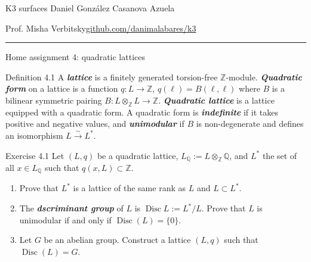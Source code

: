 

\usepackage[style=authortitle-terse,backend=bibtex]{biblatex}


\setcounter{secnumdepth}{0}



\begin{minipage}{\textwidth}
	\begin{minipage}{1\textwidth}
		K3 surfaces \hfill Daniel González Casanova Azuela
		
		{\small Prof. Misha Verbitsky\hfill\href{https://github.com/danimalabares/k3}{github.com/danimalabares/k3}}
	\end{minipage}
\end{minipage}\vspace{.2cm}\hrule

\vspace{10pt}
{\huge Home assignment 4: quadratic lattices}

\begin{idea5}{Definition 4.1}\leavevmode
	A \textit{\textbf{lattice}} is a finitely generated torsion-free $\mathbb{Z}$-module. \textit{\textbf{Quadratic form}} on a lattice is a function $q:L\to \mathbb{Z}$, $q(\ell)=B(\ell,\ell)$ where $B$ is a bilinear symmetric pairing $B:L\otimes_\mathbb{Z}L\longrightarrow \mathbb{Z}$. \textit{\textbf{Quadratic lattice}} is a lattice equipped with a quadratic form. A quadratic form is \textit{\textbf{indefinite}} if it takes positive and negative values, and \textit{\textbf{unimodular}} if $B$ is non-degenerate and defines an isomorphism $L\xrightarrow{\sim}L^*$.
\end{idea5}

\begin{idea4}{Exercise 4.1}\leavevmode
	Let $(L,q)$ be a quadratic lattice, $L_{\mathbb{Q}}:=L\otimes_{\mathbb{Z}}\mathbb{Q}$, and $L^*$ the set of all $x\in L_{\mathbb{Q}}$ such that $q(x,L)\subset \mathbb{Z}$.
	\begin{enumerate}[label=\alph*.]
		\item Prove that $L^*$ is a lattice of the same rank as $L$ and $L\subset L^*$.
		\item The \textit{\textbf{dscriminant group}} of $L$ is $\operatorname{Disc}L:=L^*/L$. Prove that $L$ is unimodular if and only if $\operatorname{Disc}(L)=\{0\}$.
		\item Let $G$ be an abelian group. Construct a lattice $(L,q)$ such that $\operatorname{Disc}(L)=G$.
	\end{enumerate}
\end{idea4}

